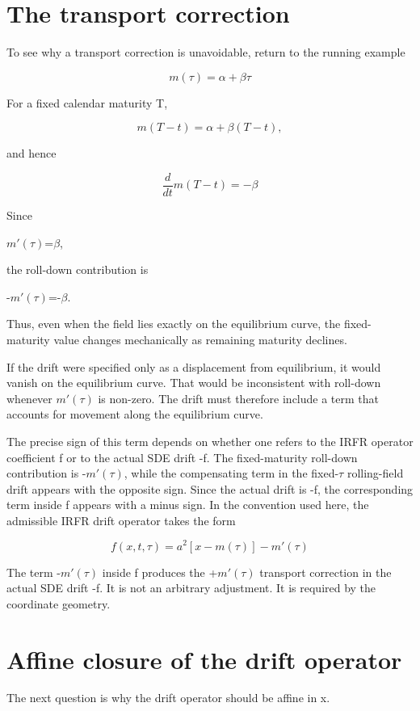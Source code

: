 \documentclass[11pt,oneside]{book}
\begin{document}
\section{The transport correction}\label{the-transport-correction}

To see why a transport correction is unavoidable, return to the running
example

\[
m(\tau)=\alpha+\beta\tau
\]

For a fixed calendar maturity T,

\[
m(T-t)=\alpha+\beta(T-t),
\]

and hence

\[
\frac{d}{dt} m(T-t) = -\beta
\]

Since

$m'(\tau)$=$\beta$,

the roll-down contribution is

-$m'(\tau)$=-$\beta$.

Thus, even when the field lies exactly on the equilibrium curve, the
fixed-maturity value changes mechanically as remaining maturity
declines.

If the drift were specified only as a displacement from equilibrium, it
would vanish on the equilibrium curve. That would be inconsistent with
roll-down whenever $m'(\tau)$ is non-zero. The drift must therefore include a
term that accounts for movement along the equilibrium curve.

The precise sign of this term depends on whether one refers to the IRFR
operator coefficient f or to the actual SDE drift -f. The fixed-maturity
roll-down contribution is -$m'(\tau)$, while the compensating term in the
fixed-$\tau$ rolling-field drift appears with the opposite sign. Since the
actual drift is -f, the corresponding term inside f appears with a minus
sign. In the convention used here, the admissible IRFR drift operator
takes the form

\[
f(x,t,\tau) = a^2[x-m(\tau)] - m'(\tau)
\]

The term -$m'(\tau)$ inside f produces the +$m'(\tau)$ transport correction in the
actual SDE drift -f. It is not an arbitrary adjustment. It is required
by the coordinate geometry.

\section{Affine closure of the drift
operator}\label{affine-closure-of-the-drift-operator}

The next question is why the drift operator should be affine in x.
\end{document}
